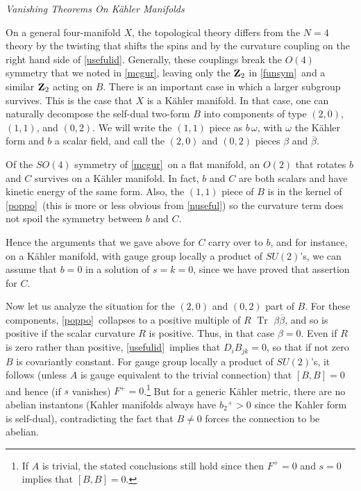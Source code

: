 \documentclass[12pt]{article}
\numberwithin{equation}{section}
\def\bar{\overline}
\DeclareMathOperator{\Tr}{Tr}
\begin{document}
\bigskip
\noindent
{\it Vanishing Theorems On K\"ahler Manifolds}

On a general four-manifold $X$, the topological theory differs from the
$N=4$ theory by the twisting that shifts the spins and by the curvature
coupling on the right hand side of \eqref{usefulid}.  Generally, these couplings
break the $O(4)$ symmetry that we noted in \eqref{mcgur}, leaving only the
${\bf Z}_2$ in \eqref{funsym}\ and a similar ${\bf Z}_2$ acting on $B$.
There is an important case in which a larger subgroup
survives.  This is the case that $X$ is a K\"ahler manifold.
In that case, one can naturally decompose the self-dual two-form $B$
into components of type $(2,0)$, $(1,1)$, and $(0,2)$.  We will
write the $(1,1)$ piece as $b\,\omega$, with $\omega$ the K\"ahler form and
$b$ a scalar field,
and call the $(2,0)$ and $(0,2)$ pieces $\beta$ and $\bar \beta$.

Of the $SO(4)$ symmetry of \eqref{mcgur}\ on a flat manifold, an $O(2)$
that rotates $b$ and $C$ survives on a K\"ahler manifold.  In fact,
$b$ and $C$ are both scalars and have kinetic energy of the same form.
Also,
the $(1,1)$ piece of $B$ is in the kernel of \eqref{poppo}\
(this is more or less obvious
from \eqref{nuseful}) so the curvature term does not spoil the symmetry
between $b$ and $C$.

Hence the arguments that we gave above for $C$ carry over to $b$,
and for instance, on a K\"ahler manifold, with gauge group locally
a product of $SU(2)$'s, we can assume that $b=0$ in a solution
of $s=k=0$, since we have proved that assertion for $C$.

Now let us analyze the situation for the $(2,0)$ and $(0,2)$ part of
$B$.  For these components, \eqref{poppo}\ collapses to a positive
multiple of $R\,\,\Tr\,\, \beta\bar\beta$, and so is positive if the scalar
curvature $R$ is
positive.  Thus, in that case $\beta=0$.
Even if $R$ is zero rather than positive, \eqref{usefulid}\
implies that $D_iB_{jk}=0$, so that if not
zero $B$ is covariantly constant.
For gauge group locally a product of $SU(2)$'s, it follows (unless $A$
is gauge equivalent to the trivial connection) that
$[B,B]=0$ and hence (if $s$ vanishes) $F^+=0$.\footnote{If $A$ is
  trivial, the stated conclusions still hold since then $F^+=0$ and
$s=0$ implies that $[B,B]=0$.}
But for a generic
K\"ahler metric, there are no abelian instantons (Kahler manifolds
always have $b_2{}^+>0$ since the Kahler form is self-dual), contradicting the
fact that $B\not= 0$ forces the connection to be abelian.
\end{document}
